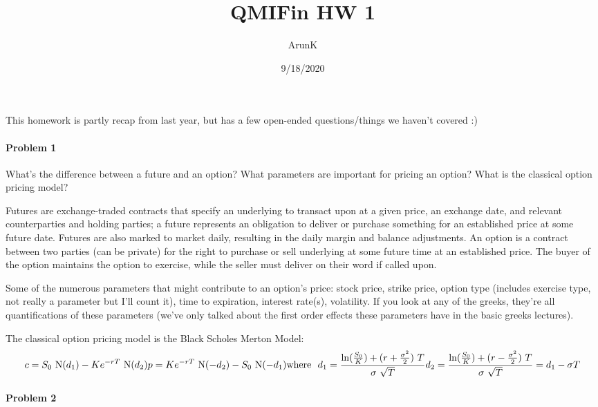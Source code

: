 \documentclass[
]{article}
\title{QMIFin HW 1}
\author{ArunK}
\date{9/18/2020}
\begin{document}
\maketitle

This homework is partly recap from last year, but has a few open-ended
questions/things we haven't covered :)

\hypertarget{problem-1}{%
\paragraph{Problem 1}\label{problem-1}}

What's the difference between a future and an option? What parameters
are important for pricing an option? What is the classical option
pricing model?

Futures are exchange-traded contracts that specify an underlying to
transact upon at a given price, an exchange date, and relevant
counterparties and holding parties; a future represents an obligation to
deliver or purchase something for an established price at some future
date. Futures are also marked to market daily, resulting in the daily
margin and balance adjustments. An option is a contract between two
parties (can be private) for the right to purchase or sell underlying at
some future time at an established price. The buyer of the option
maintains the option to exercise, while the seller must deliver on their
word if called upon.

Some of the numerous parameters that might contribute to an option's
price: stock price, strike price, option type (includes exercise type,
not really a parameter but I'll count it), time to expiration, interest
rate(s), volatility. If you look at any of the greeks, they're all
quantifications of these parameters (we've only talked about the first
order effects these parameters have in the basic greeks lectures).

The classical option pricing model is the Black Scholes Merton Model:
\[c = S_0\ \text{N}(d_1)-Ke^{-rT}\ \text{N}(d_2) \\ p = Ke^{-rT}\ \text{N}(-d_2)-S_0\ \text{N}(-d_1) \\ \text{where }\  d_1 = \frac{\text{ln}(\frac{S_0}{K})+(r+\frac{\sigma^2}{2})\ T}{\sigma\ \sqrt{T}} \\ d_2 = \frac{\text{ln}(\frac{S_0}{K})+(r-\frac{\sigma^2}{2})\ T}{\sigma\ \sqrt{T}} = d_1 - \sigma T\]

\hypertarget{problem-2}{%
\paragraph{Problem 2}\label{problem-2}}
\end{document}
